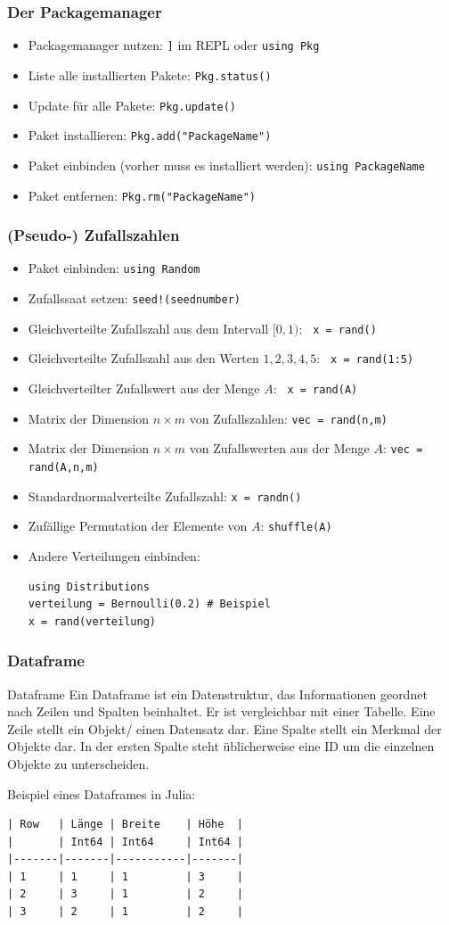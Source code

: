 \begin{frame}[fragile]
\frametitle{Der Packagemanager}
\begin{itemize}[<+->]
\item Packagemanager nutzen: \verb+]+ im REPL oder \verb+using Pkg+
\item Liste alle installierten Pakete: \verb+Pkg.status()+
\item Update für alle Pakete: \verb+Pkg.update()+
\item Paket installieren: \verb+Pkg.add("PackageName")+
\item Paket einbinden (vorher muss es installiert werden): \verb+using PackageName+
\item Paket entfernen: \verb+Pkg.rm("PackageName")+
\end{itemize}
\end{frame}
\begin{frame}[fragile]
\frametitle{(Pseudo-) Zufallszahlen}
\begin{itemize}[<+->]
\item Paket einbinden: \verb+using Random+
\item Zufallssaat setzen: \verb+seed!(seednumber)+
\item Gleichverteilte Zufallszahl aus dem Intervall $[0,1)$: \verb+ x = rand()+
\item Gleichverteilte Zufallszahl aus den Werten $1,2,3,4,5$: \verb+ x = rand(1:5)+
\item Gleichverteilter Zufallswert aus der Menge $A$: \verb+ x = rand(A)+
\item Matrix der Dimension $n\times m$ von Zufallszahlen: \verb+vec = rand(n,m)+
\item Matrix der Dimension $n\times m$ von Zufallswerten aus der Menge $A$: \verb+vec = rand(A,n,m)+
\item Standardnormalverteilte Zufallszahl: \verb+x = randn()+
\item Zufällige Permutation der Elemente von $A$: \verb+shuffle(A)+
\item Andere Verteilungen einbinden:
\begin{verbatim}
using Distributions
verteilung = Bernoulli(0.2) # Beispiel
x = rand(verteilung)
\end{verbatim}
\end{itemize}
\end{frame}
\begin{frame}[fragile]
\frametitle{Dataframe}
\begin{block}{Dataframe}
Ein Dataframe ist ein Datenstruktur, das Informationen geordnet nach Zeilen und Spalten beinhaltet. Er ist vergleichbar mit einer Tabelle. Eine Zeile stellt ein Objekt/ einen Datensatz dar. Eine Spalte stellt ein Merkmal der Objekte dar. In der ersten Spalte steht üblicherweise eine ID um die einzelnen Objekte zu unterscheiden.
\end{block}
Beispiel eines Dataframes in Julia:
\begin{verbatim}
| Row   | Länge | Breite    | Höhe  |
|       | Int64 | Int64     | Int64 |
|-------|-------|-----------|-------|
| 1     | 1     | 1         | 3     |
| 2     | 3     | 1         | 2     |
| 3     | 2     | 1         | 2     |
\end{verbatim}
\end{frame}
